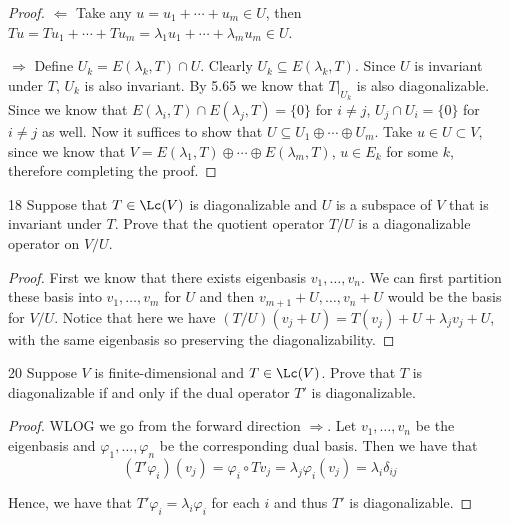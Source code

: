 \documentclass{extarticle}
\begin{document}
\begin{proof}
\(\Leftarrow\) Take any \(u = u_1 + \cdots + u_m \in U\), then \(Tu = Tu_1 + \cdots + Tu_m 
= \lambda_1 u_1 + \cdots + \lambda_m u_m \in U\). 

\(\Rightarrow\) Define \(U_k = E(\lambda_k, T) \cap U\). Clearly \(U_k \subseteq E(\lambda_k, T)\). 
Since \(U\) is invariant under \(T\), \({U_k}\) is also invariant. By 5.65 we know that 
\(T |_{U_k}\) is also diagonalizable. Since we know that \(E(\lambda_i, T) \cap E(\lambda_j, T) = \{0\}\) for \(i \neq j\), 
\(U_j \cap U_i = \{0\}\) for \(i \neq j\) as well. Now it suffices to show that 
\(U \subseteq U_1 \oplus \cdots \oplus U_m\). Take \(u \in U \subset V\), since we know that 
\(V = E(\lambda_1, T) \oplus \cdots \oplus E(\lambda_m, T)\), \(u \in E_k\) for some \(k\), therefore 
completing the proof. 
\end{proof}

\begin{problem}{18}
    Suppose that \(T \in \Lc(V)\) is diagonalizable and \(U\) is a subspace of \(V\) that is invariant under 
    \(T\). Prove that the quotient operator \(T/U\) is a diagonalizable operator on \(V/U\). 
\end{problem}

\begin{proof}
First we know that there exists eigenbasis \(v_1, \ldots, v_n\). We can first partition these basis into 
\(v_1, \ldots, v_m\) for \(U\) and then \(v_{m+1} + U, \ldots, v_n + U\) would be the basis for 
\(V/U\). Notice that here we have \((T/U)(v_j + U) = T(v_j) + U + \lambda_j v_j + U\), with the same eigenbasis 
so preserving the diagonalizability.
\end{proof}

\begin{problem}{20}
    Suppose \(V\) is finite-dimensional and \(T \in \Lc(V)\). Prove that \(T\) is diagonalizable if 
    and only if the dual operator \(T'\) is diagonalizable. 
\end{problem}

\begin{proof}
WLOG we go from the forward direction \(\Rightarrow\). Let \(v_1, \ldots, v_n\) be the eigenbasis and 
\(\varphi_1, \ldots, \varphi_n\) be the corresponding dual basis. Then we have that 
\[(T' \varphi_i)(v_j) = \varphi_i \circ Tv_j = \lambda_j \varphi_i(v_j) = \lambda_i \delta_{ij}\]

Hence, we have that \(T' \varphi_i = \lambda_i \varphi_i\) for each \(i\) and thus \(T'\) is diagonalizable.
\end{proof}
\end{document}
